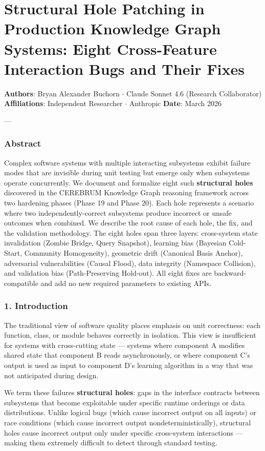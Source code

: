 \section{Structural Hole Patching in Production Knowledge Graph Systems: Eight Cross-Feature Interaction Bugs and Their Fixes}

\textbf{Authors}: Bryan Alexander Buchorn $\cdot$ Claude Sonnet 4.6 (Research Collab\-orator)
\textbf{Affili\-ations}: Independent Researcher $\cdot$ Anthropic
\textbf{Date}: March 2026

---

\subsubsection{Abstract}
Complex software systems with multiple interacting subsystems exhibit failure modes that are invisible during unit testing but emerge only when subsystems operate concu\-rrently. We document and formalize eight such \textbf{structural holes} discovered in the CEREBRUM Knowledge Graph reasoning framework across two hardening phases (Phase 19 and Phase 20). Each hole represents a scenario where two indep\-endently-correct subsystems produce incorrect or unsafe outcomes when combined. We describe the root cause of each hole, the fix, and the validation methodology. The eight holes span three layers: cross-system state inval\-idation (Zombie Bridge, Query Snapshot), learning bias (Bayesian Cold-Start, Community Homogeneity), geometric drift (Canonical Basis Anchor), adversarial vulne\-rabilities (Causal Flood), data integrity (Namespace Collision), and validation bias (Path-Preserving Hold-out). All eight fixes are backward-compatible and add no new required parameters to existing APIs.

\subsubsection{1. Introd\-uction}
The traditional view of software quality places emphasis on unit correctness: each function, class, or module behaves correctly in isolation. This view is insuf\-ficient for systems with cross-cutting state — systems where component A modifies shared state that component B reads async\-hronously, or where component C's output is used as input to component D's learning algorithm in a way that was not anticipated during design.

We term these failures \textbf{structural holes}: gaps in the interface contracts between subsystems that become exploitable under specific runtime orderings or data distr\-ibutions. Unlike logical bugs (which cause incorrect output on all inputs) or race conditions (which cause incorrect output nonde\-terministi\-cally), structural holes cause incorrect output only under specific cross-system inter\-actions — making them extremely difficult to detect through standard testing.

